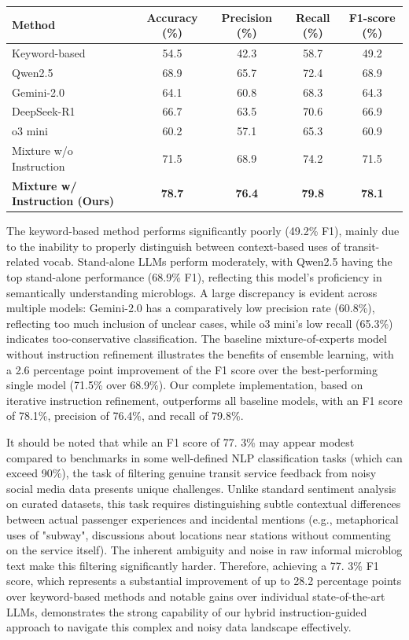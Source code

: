 \documentclass[a4paper,fleqn,12pt]{cas-sc}
\begin{document}
\begin{center}
\label{tab:filtering_performance}
\begin{tabular}{lcccc}
\toprule
Method & Accuracy (\%) & Precision (\%) & Recall (\%) & F1-score (\%) \\
\midrule
Keyword-based & 54.5 & 42.3 & 58.7 & 49.2 \\
Qwen2.5 & 68.9 & 65.7 & 72.4 & 68.9 \\
Gemini-2.0 & 64.1 & 60.8 & 68.3 & 64.3 \\
DeepSeek-R1 & 66.7 & 63.5 & 70.6 & 66.9 \\
o3 mini & 60.2 & 57.1 & 65.3 & 60.9 \\
Mixture w/o Instruction & 71.5 & 68.9 & 74.2 & 71.5 \\
\textbf{Mixture w/ Instruction (Ours)} & \textbf{78.7} & \textbf{76.4} & \textbf{79.8} & \textbf{78.1} \\
\bottomrule
\end{tabular}
\end{center}

The keyword-based method performs significantly poorly (49.2\% F1), mainly due to the inability to properly distinguish between context-based uses of transit-related vocab. Stand-alone LLMs perform moderately, with Qwen2.5 having the top stand-alone performance (68.9\% F1), reflecting this model's proficiency in semantically understanding microblogs. A large discrepancy is evident across multiple models: Gemini-2.0 has a comparatively low precision rate (60.8\%), reflecting too much inclusion of unclear cases, while o3 mini's low recall (65.3\%) indicates too-conservative classification. The baseline mixture-of-experts model without instruction refinement illustrates the benefits of ensemble learning, with a 2.6 percentage point improvement of the F1 score over the best-performing single model (71.5\% over 68.9\%). Our complete implementation, based on iterative instruction refinement, outperforms all baseline models, with an F1 score of 78.1\%, precision of 76.4\%, and recall of 79.8\%.

It should be noted that while an F1 score of 77. 3\% may appear modest compared to benchmarks in some well-defined NLP classification tasks (which can exceed 90\%), the task of filtering genuine transit service feedback from noisy social media data presents unique challenges. Unlike standard sentiment analysis on curated datasets, this task requires distinguishing subtle contextual differences between actual passenger experiences and incidental mentions (e.g., metaphorical uses of "subway", discussions about locations near stations without commenting on the service itself). The inherent ambiguity and noise in raw informal microblog text make this filtering significantly harder. Therefore, achieving a 77. 3\% F1 score, which represents a substantial improvement of up to 28.2 percentage points over keyword-based methods and notable gains over individual state-of-the-art LLMs, demonstrates the strong capability of our hybrid instruction-guided approach to navigate this complex and noisy data landscape effectively.
\end{document}
